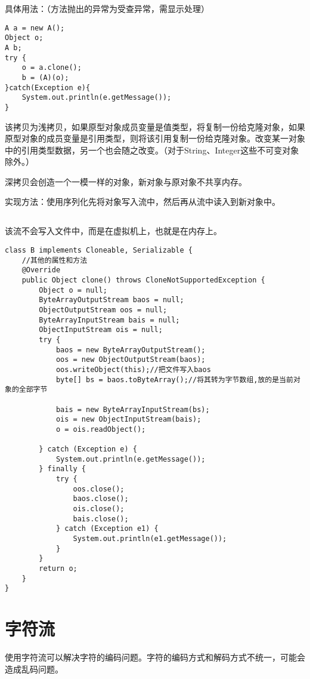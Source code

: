 \documentclass[a4paper]{report}
\begin{document}
具体用法：（方法抛出的异常为受查异常，需显示处理）
\begin{lstlisting}
A a = new A();
Object o;
A b;
try {
    o = a.clone();
    b = (A)(o);
}catch(Exception e){
    System.out.println(e.getMessage());
}
\end{lstlisting}
该拷贝为浅拷贝，如果原型对象成员变量是值类型，将复制一份给克隆对象，如果原型对象的成员变量是引用类型，则将该引用复制一份给克隆对象。改变某一对象中的引用类型数据，另一个也会随之改变。（对于String、Integer这些不可变对象除外。）

深拷贝会创造一个一模一样的对象，新对象与原对象不共享内存。

实现方法：使用序列化先将对象写入流中，然后再从流中读入到新对象中。

\subsection{}

该流不会写入文件中，而是在虚拟机上，也就是在内存上。

\begin{lstlisting}[title=深拷贝]
class B implements Cloneable, Serializable {
    //其他的属性和方法
    @Override
    public Object clone() throws CloneNotSupportedException {
        Object o = null;
        ByteArrayOutputStream baos = null;
        ObjectOutputStream oos = null;
        ByteArrayInputStream bais = null;
        ObjectInputStream ois = null;
        try {
            baos = new ByteArrayOutputStream();
            oos = new ObjectOutputStream(baos);
            oos.writeObject(this);//把文件写入baos
            byte[] bs = baos.toByteArray();//将其转为字节数组,放的是当前对象的全部字节

            bais = new ByteArrayInputStream(bs);
            ois = new ObjectInputStream(bais);
            o = ois.readObject();

        } catch (Exception e) {
            System.out.println(e.getMessage());
        } finally {
            try {
                oos.close();
                baos.close();
                ois.close();
                bais.close();
            } catch (Exception e1) {
                System.out.println(e1.getMessage());
            }
        }
        return o;
    }
}
\end{lstlisting}
\section{字符流}
使用字符流可以解决字符的编码问题。字符的编码方式和解码方式不统一，可能会造成乱码问题。
\end{document}

